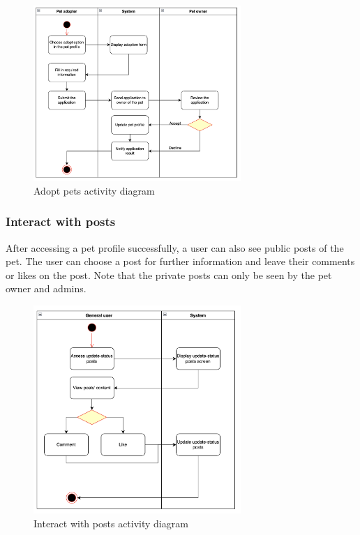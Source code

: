\begin{figure}[H]
  \centering
  \includegraphics[width=0.7\textwidth]{Figures/adopt_pet.png}
  \caption{Adopt pets activity diagram}
  \label{fig:adopt-pet}
\end{figure}

\subsubsection{Interact with posts}

After accessing a pet profile successfully, a user can also see public posts of the pet. The user can choose a post for further information and leave their comments or likes on the post. Note that the private posts can only be seen by the pet owner and admins.

\begin{figure}[H]
  \centering
  \includegraphics[width=0.7\textwidth]{Figures/post_interact.png}
  \caption{Interact with posts activity diagram}
  \label{fig:interact-post}
\end{figure}


